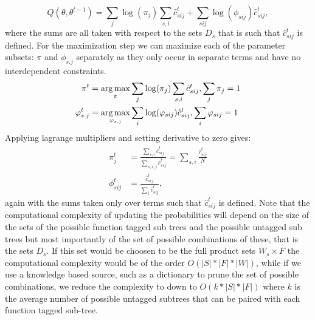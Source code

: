 \begin{equation*}
Q(\theta,\theta^{t-1})=\sum_j\log(\pi_j)\sum_{s,i}\hat c^t_{sij} + \sum_{sij}\log(\phi_{sij})\hat c^t_{sij},
\end{equation*}
where the sums are all taken with respect to the sets $D_s$ that is such that $\hat c^{t}_{sij}$ is defined.
For the maximization step we can maximize each of the parameter subsets: $\pi$ and $\phi_{s.j}$ separately as they only occur in separate terms and have no interdependent constraints.
\begin{equation*}
\begin{split}
\pi^t &= \operatorname*{arg\,max}_{\pi}
\sum_j\log(\pi_j)\sum_{s,i}\hat c^t_{sij}, \sum_j\pi_j = 1\\
\varphi_{s.j}^t &= \operatorname*{arg\,max}_{\varphi_{s.j}} \sum_i
\log(\varphi_{sij})\hat c^t_{sij}, \sum_i \varphi_{sij} = 1
\end{split}
\end{equation*}
Applying lagrange multipliers and setting derivative to zero gives:
\begin{equation}
\label{eq:em_update}
\begin{split}
\pi^t_j &= \frac{\sum_{s,i}\hat c^t_{sij}}
{\sum_{s,i,j} \hat c^t_{sij}}
= \sum_{s,i}\frac{\hat c^t_{sij}}
{N}\\
\phi_{sij}^t &= 
\frac{\hat c^t_{sij}}
{\sum_{i} \hat c^t_{sij}},
\end{split}
\end{equation}
again with the sums taken only over terms such that $\hat c^t_{sij}$ is defined.
Note that the computational complexity of updating the probabilities will depend on the size of the sets of the possible function tagged sub trees and the possible untagged sub trees but most importantly of the set of possible combinations of these, that is the sets $D_s$. If this set would be choosen to be the full product sets $W_s \times F$ the computational complexity would be of the order $O(|S|*|F|*|W|)$, while if we use a knowledge based source, such as a dictionary to prune the set of possible combinations, we reduce the complexity to down to $O(k*|S|*|F|)$ where $k$ is the average number of possible untagged subtrees that can be paired with each function tagged sub-tree.

